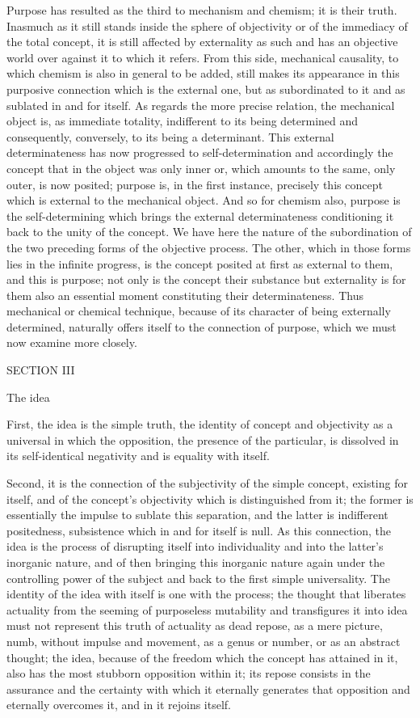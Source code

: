 Purpose has resulted as the third
to mechanism and chemism;
it is their truth.
Inasmuch as it still stands
inside the sphere of objectivity
or of the immediacy of the total concept,
it is still affected by externality as such
and has an objective world over
against it to which it refers.
From this side, mechanical causality,
to which chemism is also in general to be added,
still makes its appearance in this purposive connection
which is the external one,
but as subordinated to it
and as sublated in and for itself.
As regards the more precise relation,
the mechanical object is, as immediate totality,
indifferent to its being determined and consequently,
conversely, to its being a determinant.
This external determinateness has now
progressed to self-determination
and accordingly the concept that
in the object was only inner
or, which amounts to the same,
only outer, is now posited;
purpose is, in the first instance,
precisely this concept which is
external to the mechanical object.
And so for chemism also, purpose is the self-determining
which brings the external determinateness conditioning it
back to the unity of the concept.
We have here the nature of the subordination of
the two preceding forms of the objective process.
The other, which in those forms lies in the infinite progress,
is the concept posited at first as external to them,
and this is purpose;
not only is the concept their substance
but externality is for them also
an essential moment constituting their determinateness.
Thus mechanical or chemical technique,
because of its character of being externally determined,
naturally offers itself to the connection of purpose,
which we must now examine more closely.

SECTION III

The idea

First, the idea is the simple truth,
the identity of concept and objectivity as a
universal in which the opposition,
the presence of the particular,
is dissolved in its self-identical negativity
and is equality with itself.

Second, it is the connection of the subjectivity
of the simple concept, existing for itself,
and of the concept's objectivity which is distinguished from it;
the former is essentially the impulse to sublate this separation,
and the latter is indifferent positedness,
subsistence which in and for itself is null.
As this connection, the idea is
the process of disrupting itself into individuality
and into the latter's inorganic nature,
and of then bringing this inorganic nature again
under the controlling power of the subject
and back to the first simple universality.
The identity of the idea with itself is one with the process;
the thought that liberates actuality from
the seeming of purposeless mutability
and transfigures it into idea
must not represent this truth of actuality
as dead repose, as a mere picture, numb, without impulse and movement,
as a genus or number, or as an abstract thought;
the idea, because of the freedom which the concept has attained in it,
also has the most stubborn opposition within it;
its repose consists in the assurance and the certainty
with which it eternally generates that opposition
and eternally overcomes it, and in it rejoins itself.

